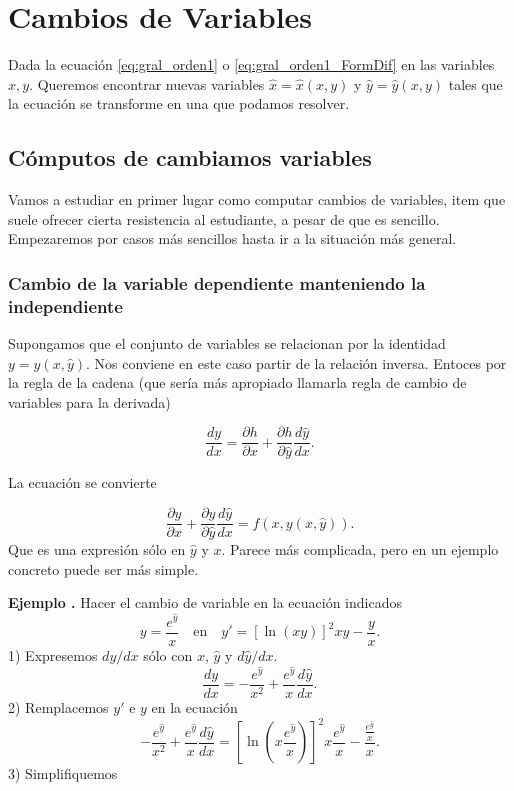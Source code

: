 \documentclass{article}
\newcounter{ejemplo_cont}
\newenvironment{ejemplo}{\noindent\textbf{Ejemplo  \arabic{ejemplo_cont}.} }{\addtocounter{ejemplo_cont}{1}}
\begin{document}
\section{Cambios de Variables}

\begin{problema}
 Dada la ecuación \eqref{eq:gral_orden1} o \eqref{eq:gral_orden1_FormDif} en las variables $x,y$. Queremos encontrar nuevas variables $\hat{x}=\hat{x}(x,y)$ y $\hat{y}=\hat{y}(x,y)$ tales que la ecuación se transforme en una que podamos resolver.
\end{problema}






\subsection{Cómputos de cambiamos variables}
Vamos a estudiar en primer lugar como computar cambios de variables, item que suele ofrecer cierta resistencia al estudiante, a pesar de que es sencillo. Empezaremos por casos más sencillos hasta ir a la situación más general.

\subsubsection{Cambio de la variable dependiente manteniendo la independiente}

Supongamos que el conjunto de variables se relacionan  por la identidad $y=y(x,\hat{y})$. Nos conviene en este caso partir de la relación inversa. Entoces por la regla de la cadena (que sería más apropiado llamarla regla de cambio de variables para la derivada)

\[\frac{dy}{dx}=\frac{\partial h}{\partial x}+\frac{\partial h}{\partial \hat{y}}\frac{d\hat{y}}{dx}.\]

La ecuación se convierte

\[\frac{\partial y}{\partial x}+\frac{\partial y}{\partial \hat{y}}\frac{d\hat{y}}{dx}=f(x,y(x,\hat{y})).\]
Que es una expresión sólo en $\hat{y}$ y $x$. Parece más complicada, pero en un ejemplo concreto puede ser más simple.







\begin{ejemplo} Hacer el cambio de variable en la  ecuación indicados
\[y=\frac{e^{\hat{y}}}{x}\quad\text{en}\quad  y'=\left[\ln(xy)\right]^2xy-\frac{y}{x}.\]
 1) Expresemos $dy/dx$ sólo con $x$, $\hat{y}$ y $d\hat{y}/dx$.
\[\frac{dy}{dx}=-\frac{e^{\hat{y}}}{x^2}+\frac{e^{\hat{y}}}{x}\frac{d\hat{y}}{dx}.\]
 2) Remplacemos $y'$ e $y$ en la ecuación
\[-\frac{e^{\hat{y}}}{x^2}+\frac{e^{\hat{y}}}{x}\frac{d\hat{y}}{dx}=\left[\ln\left(x \frac{e^{\hat{y}}}{x} \right)\right]^2x\frac{e^{\hat{y}}}{x}-\frac{\frac{e^{\hat{y}}}{x} }{x}.\]
 3) Simplifiquemos




\end{ejemplo}
\end{document}

